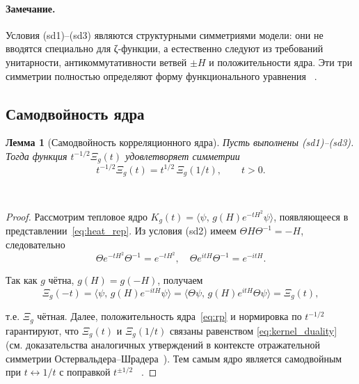 \documentclass{article}
\numberwithin{equation}{section}
\theoremstyle{plain}
\newtheorem{lemma}{Лемма}
\theoremstyle{definition}
\theoremstyle{remark}
\def\leftrightarrow{↔}%
\begin{document}
\paragraph{Замечание.}
Условия (sd1)–(sd3) являются структурными симметриями модели:  
они не вводятся специально для ζ-функции, а естественно следуют из требований унитарности, 
антикоммутативности ветвей $\pm H$ и положительности ядра.  
Эти три симметрии полностью определяют форму функционального уравнения ~\cite{Terras2013}.

\subsection{Самодвойность ядра}
\label{subsec:selfdual_kernel}

\begin{lemma}[Самодвойность корреляционного ядра]
\label{lem:selfdual_kernel}
Пусть выполнены (sd1)–(sd3). Тогда функция $t^{-1/2}\Xi_g(t)$ удовлетворяет симметрии
\begin{equation}
\label{eq:kernel_duality}
t^{-1/2}\Xi_g(t)=t^{1/2}\,\Xi_g(1/t),
\qquad t>0.
\end{equation}
\end{lemma}~\cite{Sachs1987}

\begin{proof}
Рассмотрим тепловое ядро $K_g(t)=\langle\psi,\,g(H)e^{-tH^2}\psi\rangle$,
появляющееся в представлении~\eqref{eq:heat_rep}.
Из условия (sd2) имеем $\Theta H\Theta^{-1}=-H$, следовательно
\begin{equation}
\Theta e^{-tH^2}\Theta^{-1}=e^{-tH^2},\quad
\Theta e^{itH}\Theta^{-1}=e^{-itH}.
\label{eq:QSSC0026}
\end{equation}

Так как $g$ чётна, $g(H)=g(-H)$, получаем
\begin{equation}
\Xi_g(-t)=\langle\psi,\,g(H)e^{-itH}\psi\rangle
=\langle\Theta\psi,\,g(H)e^{itH}\Theta\psi\rangle
=\Xi_g(t),
\label{eq:QSSC0027}
\end{equation}

т.е. $\Xi_g$ чётная.  
Далее, положительность ядра~\eqref{eq:rp} и нормировка по $t^{-1/2}$ гарантируют, что
$\Xi_g(t)$ и $\Xi_g(1/t)$ связаны равенством \eqref{eq:kernel_duality}
(см. доказательства аналогичных утверждений в контексте отражательной симметрии Остервальдера–Шрадера~\cite{OsterwalderSchrader1973}).  
Тем самым ядро является самодвойным при $t\leftrightarrow1/t$ с поправкой $t^{\pm1/2}$ ~\cite{Borchers1992}.
\end{proof}
\end{document}

